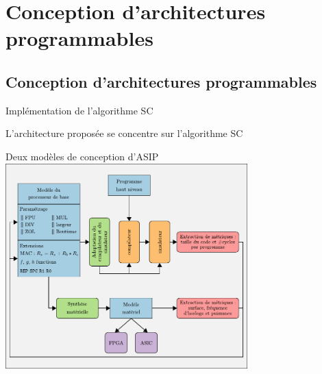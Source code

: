

\section{Conception d'architectures programmables}



\subsection*{Conception d'architectures programmables}


\begin{frame}[c]{Implémentation de l'algorithme SC}
\vfill
  \begin{table}[t]
    \centering
    {\small{}}
  \end{table}
  \vfill
  \centering
  L'architecture proposée se concentre sur l'algorithme SC
  \vfill
\end{frame}


\begin{frame}[c]{Deux modèles de conception d'ASIP}
  \centering
  \includegraphics[width=0.7\textwidth]{./fig/methodos-1}
\end{frame}

